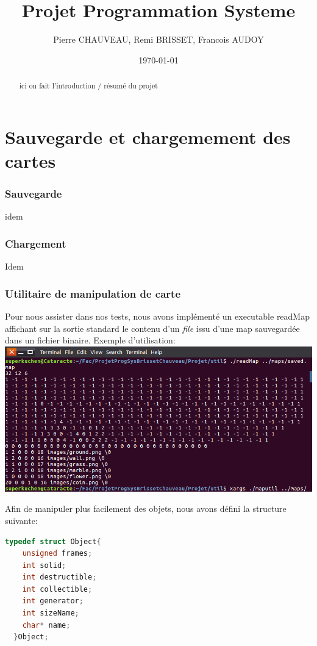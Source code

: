 \documentclass[a4paper]{article}
\title{Projet Programmation Systeme}
\author{Pierre CHAUVEAU, Remi BRISSET, Francois AUDOY}
\date{\today} %
\begin{document}
\maketitle

\begin{abstract}
  ici on fait l'introduction / résumé du projet
\end {abstract}

\part{Sauvegarde et chargemement des cartes}

\section{Sauvegarde}
idem

\section{Chargement}
Idem

\section{Utilitaire de manipulation de carte}
Pour nous assister dans nos tests, nous avons implémenté un executable readMap affichant sur la sortie standard le contenu d'un \emph{file} issu d'une map sauvegardée dans un fichier binaire.
Exemple d'utilisation: \\
\includegraphics[scale=0.5]{readMap.png} 

Afin de manipuler plus facilement des objets, nous avons défini la structure suivante:
\begin{lstlisting}[language=c]
  typedef struct Object{
    unsigned frames;
    int solid;
    int destructible;
    int collectible;
    int generator;
    int sizeName;
    char* name;
  }Object;
\end{lstlisting}
\end{document}
